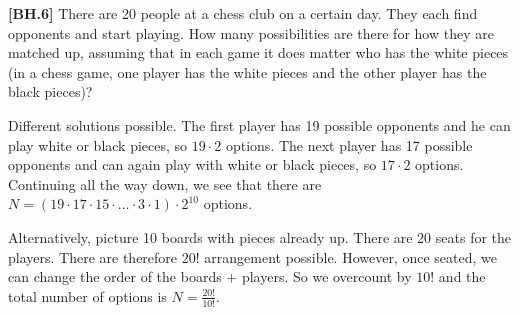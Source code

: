 \begin{exercise}\textbf{[BH.6]}
	There are 20 people at a chess club on a certain day. They each find opponents and start playing. How many possibilities are there for how they are matched up, assuming that in each game it does matter who has the white pieces (in a chess game, one player has the white pieces and the other player has the black pieces)?
\begin{solution}
	Different solutions possible. The first player has 19 possible opponents and he can play white or black pieces, so $19\cdot 2$ options. The next player has 17 possible opponents and can again play with white or black pieces, so $17\cdot 2$ options. Continuing all the way down, we see that there are $N=(19\cdot 17\cdot 15\cdot\ldots\cdot 3\cdot 1)\cdot 2^{10}$ options.

	Alternatively, picture 10 boards with pieces already up. There are 20 seats for the players. There are therefore $20!$ arrangement possible. However, once seated, we can change the order of the boards + players. So we overcount by $10!$ and the total number of options is $N=\frac{20!}{10!}$.
\end{solution}
\end{exercise}

